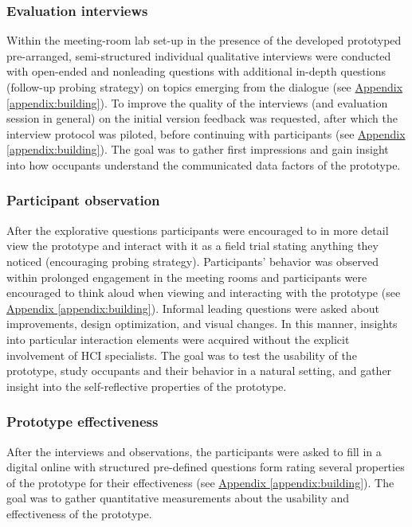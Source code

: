 \subsubsection{Evaluation interviews}

Within the meeting-room lab set-up in the presence of the developed prototyped pre-arranged, semi-structured individual qualitative interviews were conducted with open-ended and nonleading questions with additional in-depth questions (follow-up probing strategy) on topics emerging from the dialogue (see \hyperref[appendix:building]{Appendix \ref*{appendix:building}}). To improve the quality of the interviews (and evaluation session in general) on the initial version feedback was requested, after which the interview protocol was piloted, before continuing with participants (see \hyperref[appendix:building]{Appendix \ref*{appendix:building}}). The goal was to gather first impressions and gain insight into how occupants understand the communicated data factors of the prototype.

\subsubsection{Participant observation}

After the explorative questions participants were encouraged to in more detail view the prototype and interact with it as a field trial stating anything they noticed (encouraging probing strategy). Participants' behavior was observed within prolonged engagement in the meeting rooms and participants were encouraged to think aloud when viewing and interacting with the prototype (see \hyperref[appendix:building]{Appendix \ref*{appendix:building}}). Informal leading questions were asked about improvements, design optimization, and visual changes. In this manner, insights into particular interaction elements were acquired without the explicit involvement of HCI specialists. The goal was to test the usability of the prototype, study occupants and their behavior in a natural setting, and gather insight into the self-reflective properties of the prototype. 

\subsubsection{Prototype effectiveness}

After the interviews and observations, the participants were asked to fill in a digital online with structured pre-defined questions form rating several properties of the prototype for their effectiveness (see \hyperref[appendix:building]{Appendix \ref*{appendix:building}}). The goal was to gather quantitative measurements about the usability and effectiveness of the prototype.

